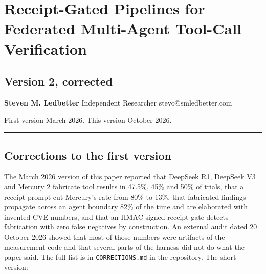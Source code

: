 \documentclass[
]{article}
\author{}
\date{}
\begin{document}
\section{Receipt-Gated Pipelines for Federated Multi-Agent Tool-Call
Verification}\label{receipt-gated-pipelines-for-federated-multi-agent-tool-call-verification}

\subsection{Version 2, corrected}\label{version-2-corrected}

\textbf{Steven M. Ledbetter} Independent Researcher
stevo@smledbetter.com

First version March 2026. This version October 2026.

\begin{center}\rule{0.5\linewidth}{0.5pt}\end{center}

\subsection{Corrections to the first
version}\label{corrections-to-the-first-version}

The March 2026 version of this paper reported that DeepSeek R1, DeepSeek
V3 and Mercury 2 fabricate tool results in 47.5\%, 45\% and 50\% of
trials, that a receipt prompt cut Mercury's rate from 80\% to 13\%, that
fabricated findings propagate across an agent boundary 82\% of the time
and are elaborated with invented CVE numbers, and that an HMAC-signed
receipt gate detects fabrication with zero false negatives by
construction. An external audit dated 20 October 2026 showed that most
of those numbers were artifacts of the measurement code and that several
parts of the harness did not do what the paper said. The full list is in
\texttt{CORRECTIONS.md} in the repository. The short version:
\end{document}
